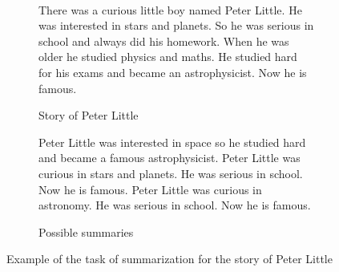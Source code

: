 \begin{figure}[H]\
\begin{subfigure}{\textwidth}
\begin{displayquote}
There was a curious little boy named Peter Little. He was interested in stars and planets. So he was serious in school and always did his homework. When he was older he studied physics and maths. He studied hard for his exams and became an astrophysicist. Now he is famous.
\end{displayquote}
\caption{Story of Peter Little}
\vspace{\baselineskip}
\end{subfigure}
\begin{subfigure}{\textwidth}
\begin{displayquote}
Peter Little was interested in space so he studied hard and became a famous astrophysicist.
Peter Little was curious in stars and planets. He was serious in school. Now he is famous.
Peter Little was curious in astronomy. He was serious in school. Now he is famous.
\caption{Possible summaries}
\end{displayquote}
\end{subfigure}
\caption{Example of the task of summarization for the story of Peter Little}
\label{fig:peter_little}
\end{figure}